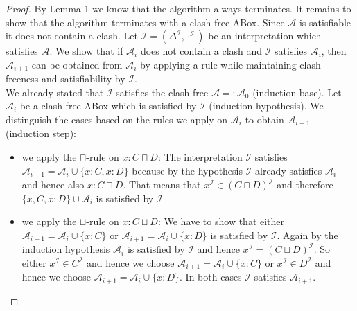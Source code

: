\documentclass{book}
\theoremstyle{break}
\theoremstyle{definition}
\begin{document}
\begin{proof}
By Lemma 1 we know that the algorithm always terminates. It remains to show that the algorithm terminates with a clash-free ABox. Since $\mathcal{A}$ is satisfiable it does not contain a clash. Let $\mathcal{I}=(\Delta^\mathcal{I},\cdot^\mathcal{I})$ be an interpretation which satisfies $\mathcal{A}$. We show that if $\mathcal{A}_i$ does not contain a clash and $\mathcal{I}$ satisfies $\mathcal{A}_i$, then $\mathcal{A}_{i+1}$ can be obtained from $\mathcal{A}_i$ by applying a rule while maintaining clash-freeness and satisfiability by $\mathcal{I}$.\\
We already stated that $\mathcal{I}$ satisfies the clash-free $\mathcal{A}=:\mathcal{A}_{0}$ (induction base).
Let $\mathcal{A}_i$ be a clash-free ABox which is satisfied by $\mathcal{I}$ (induction hypothesis).
We distinguish the cases based on the rules we apply on $\mathcal{A}_i$ to obtain $\mathcal{A}_{i+1}$ (induction step):
\begin{itemize}
\item we apply the $\sqcap$-rule on $x:C\sqcap D$: The interpretation $\mathcal{I}$ satisfies $\mathcal{A}_{i+1}=\mathcal{A}_i\cup\{x:C,x:D\}$ because by the hypothesis $\mathcal{I}$ already satisfies $\mathcal{A}_i$ and hence also $x:C\sqcap D$. That means that $x^\mathcal{I}\in(C\sqcap D)^\mathcal{I}$ and therefore $\{x,C,x:D\}\cup\mathcal{A}_i$ is satisfied by $\mathcal{I}$
\item we apply the $\sqcup$-rule on $x:C\sqcup D$: We have to show that either $\mathcal{A}_{i+1}=\mathcal{A}_i\cup\{x:C\}$ or $\mathcal{A}_{i+1}=\mathcal{A}_i\cup\{x:D\}$ is satisfied by $\mathcal{I}$. Again by the induction hypothesis $\mathcal{A}_i$ is satisfied by $\mathcal{I}$ and hence $x^\mathcal{I}=(C\sqcup D)^\mathcal{I}$. So either $x^\mathcal{I}\in C^\mathcal{I}$ and hence we choose $\mathcal{A}_{i+1}=\mathcal{A}_i\cup\{x:C\}$ or $x^\mathcal{I}\in D^\mathcal{I}$ and hence  we choose $\mathcal{A}_{i+1}=\mathcal{A}_i\cup\{x:D\}$. In both cases $\mathcal{I}$ satisfies $\mathcal{A}_{i+1}$.

\end{itemize}
\end{proof}
\end{document}
